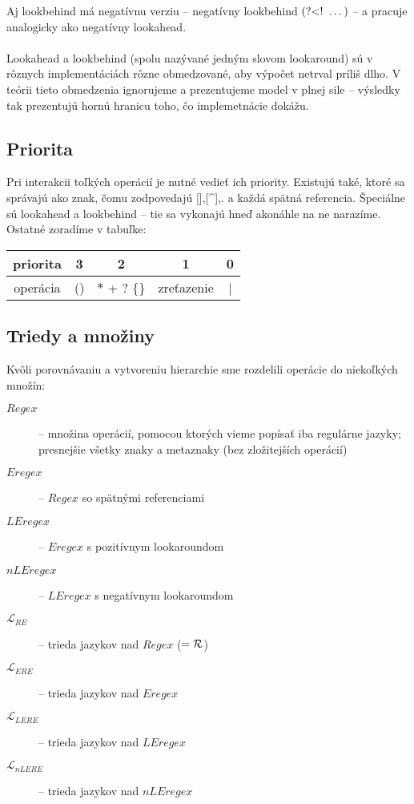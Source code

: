\documentclass{svk_long_sk}
\def\R{{\cal R}} %
\def\re{Regex}
\def\e{Eregex}
\def\le{LEregex}
\def\nle{nLEregex}
\def\rel{{\mathscr{L}_{RE}}}
\def\el{\mathscr{L}_{ERE}}
\def\lel{\mathscr{L}_{LERE}}
\def\nlel{\mathscr{L}_{nLERE}}
\def\nlookbehind{\text{(?\textless !~}}
\begin{document}
Aj lookbehind má negatívnu verziu -- negatívny lookbehind $\nlookbehind \dots)$ -- a pracuje analogicky ako negatívny lookahead.
\\ \\ Lookahead a lookbehind (spolu nazývané jedným slovom lookaround) sú v rôznych implementáciách rôzne obmedzované, aby výpočet netrval príliš dlho. V teórii tieto obmedzenia ignorujeme a prezentujeme model v plnej sile -- výsledky tak prezentujú hornú hranicu toho, čo implemetnácie dokážu. 

\subsection{Priorita}

Pri interakcii toľkých operácií je nutné vedieť ich priority. Existujú také, ktoré sa správajú ako znak, čomu zodpovedajú [],[\textasciicircum],. a každá spätná referencia. Špeciálne sú lookahead a lookbehind -- tie sa vykonajú hneď akonáhle na ne narazíme. Ostatné zoradíme v tabuľke: 

\begin{center}
\begin{tabular}{|c||c|c|c|c|}
\hline
priorita &3&2&1& 0  \\
\hline
operácia & () & $*$ + ? $\lbrace \rbrace$ & zreťazenie & | \\ \hline
\end{tabular}
\end{center}

\subsection{Triedy a množiny}
Kvôli porovnávaniu a vytvoreniu hierarchie sme rozdelili operácie do niekoľkých množín:
\begin{description}
\item[$\re$] -- množina operácií, pomocou ktorých vieme popísať iba regulárne jazyky; presnejšie všetky znaky a metaznaky (bez zložitejších operácií)
\item[$\e$] -- $\re$ so spätnými referenciami
\item[$\le$] -- $\e$ s pozitívnym lookaroundom
\item[$\nle$] -- $\le$ s negatívnym lookaroundom
\item[$\rel$] -- trieda jazykov nad $\re$ ($= \R$)
\item[$\el$] -- trieda jazykov nad $\e$
\item[$\lel$] -- trieda jazykov nad $\le$
\item[$\nlel$] -- trieda jazykov nad $\nle$
\end{description}
\end{document}
